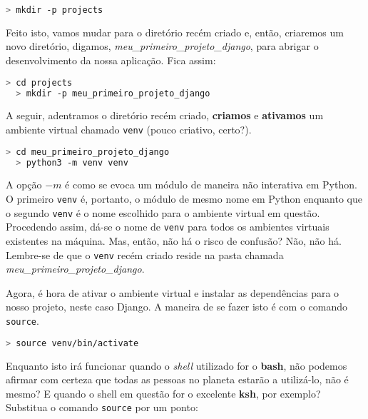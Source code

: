 \begin{lstlisting}[language=bash,caption={Criando o diretório de projetos}]
  > mkdir -p projects
\end{lstlisting}

Feito isto, vamos mudar para o diretório recém criado e, então, criaremos um
novo diretório, digamos, \textit{meu\_primeiro\_projeto\_django}, para abrigar o
desenvolvimento da nossa aplicação. Fica assim:

\begin{lstlisting}[language=bash,caption={Criando o diretório que abrigará nossa aplicação}]
  > cd projects
  > mkdir -p meu_primeiro_projeto_django
\end{lstlisting}

A seguir, adentramos o diretório recém criado, \textbf{criamos} e
\textbf{ativamos} um ambiente virtual chamado \texttt{venv} (pouco criativo,
certo?).

\begin{lstlisting}[language=bash,caption={Criando o diretório que abrigará nossa aplicação}]
  > cd meu_primeiro_projeto_django
  > python3 -m venv venv
\end{lstlisting}

A opção \(-m\) é como se evoca um módulo de maneira não interativa em Python. O
primeiro \texttt{venv} é, portanto, o módulo de mesmo nome em Python enquanto
que o segundo \texttt{venv} é o nome escolhido para o ambiente virtual em
questão. Procedendo assim, dá-se o nome de \texttt{venv} para todos os ambientes
virtuais existentes na máquina. Mas, então, não há o risco de confusão? Não, não
há. Lembre-se de que o \texttt{venv} recém criado reside na pasta chamada
\textit{meu\_primeiro\_projeto\_django}.

Agora, é hora de ativar o ambiente virtual e instalar as dependências para o
nosso projeto, neste caso Django. A maneira de se fazer isto é com o comando
\texttt{source}.

\begin{lstlisting}[language=bash,caption={Ativando o ambiente virtual -- parte 1}]
  > source venv/bin/activate
\end{lstlisting}

Enquanto isto irá funcionar quando o \textit{shell} utilizado for o
\textbf{bash}, não podemos afirmar com certeza que todas as pessoas no planeta
estarão a utilizá-lo, não é mesmo? E quando o shell em questão for o excelente
\textbf{ksh}, por exemplo? Substitua o comando \texttt{source} por um ponto:

